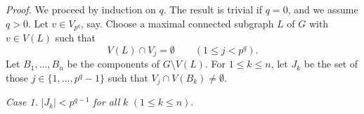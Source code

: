 \textit{Proof.} We proceed by induction on $q$. The result is trivial if $q = 0$, and we assume $q > 0$. Let $v \in V_{p^q}$, say. Choose a maximal connected subgraph $L$ of $G$ with $v \in V(L)$ such that
\begin{equation*}
V(L) \cap V_j = \emptyset \qquad (1 \le j < p^q).
\end{equation*}
Let $B_1, ..., B_n$ be the components of $G \setminus V(L)$. For $1 \le k \le n$, let $J_k$ be the set of those $j \in \{1, ..., p^q - 1\}$ such that $V_j \cap V(B_k) \ne \emptyset$.

\textit{Case 1.} $|J_k| < p^{q-1}$ \textit{for all} $k$ $(1 \le k \le n)$.
